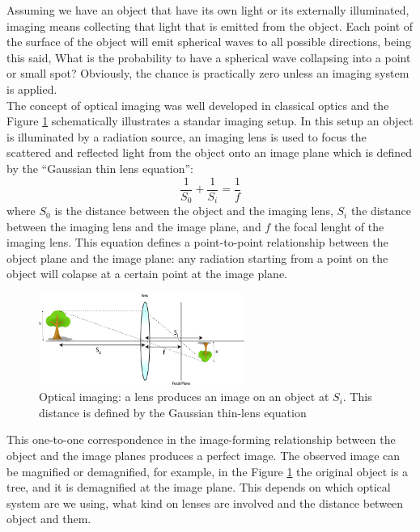 Assuming we have an object that have its own light or its externally illuminated,
imaging means collecting that light that is emitted from the object. Each point
of the surface of the object will emit spherical waves to all possible directions,
being this said, What is the probability to have a spherical wave collapsing into a point or small spot? 
Obviously, the chance is practically zero unless an imaging system is applied.
\\
The concept of optical imaging was well developed in classical optics and the Figure
\ref{fig:imaging} schematically illustrates a standar imaging setup. In this setup 
an object is illuminated by a radiation source, an imaging lens is used 
to focus the scattered and reflected light from the object onto an image plane 
which is defined by the “Gaussian thin lens equation”\cite{hecht}:
\begin{equation}
\frac{1}{S_0}+\frac{1}{S_i}=\frac{1}{f}
\end{equation}
 where $S_0$ is the distance between the object and the imaging lens, $S_i$ the distance 
between the imaging lens and the image plane, and $f$ the focal lenght of the imaging lens. This equation defines
a point-to-point relationship between the object plane and the image plane: any radiation starting from a point on the object will colapse at a certain point at the image plane.
\\
\begin{figure}[h!]
\centering
\includegraphics[width=0.6\textwidth]{Figures/imaging.png}
\caption{Optical imaging: a lens produces an image on an object at $S_i$. This distance is defined
by the Gaussian thin-lens equation} 
\label{fig:imaging}
\end{figure}
This one-to-one correspondence in the image-forming relationship between the object and the image planes produces a perfect image.
The observed image can be magnified or demagnified, for example, in the 
Figure \ref{fig:imaging} the original object is a tree, and it is demagnified at the image plane. This depends on which optical 
system are we using, what kind on lenses are involved and the distance between object and them.

